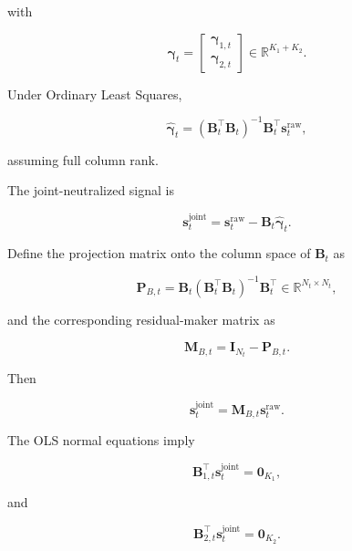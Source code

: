 \documentclass[11pt,a4paper]{article}
\begin{document}
with

\begin{equation}
\boldsymbol{\gamma}_t
=
\begin{bmatrix}
\boldsymbol{\gamma}_{1,t}
\\
\boldsymbol{\gamma}_{2,t}
\end{bmatrix}
\in
\mathbb{R}^{K_1+K_2}.
\end{equation}

Under Ordinary Least Squares,

\begin{equation}
\widehat{\boldsymbol{\gamma}}_t
=
\left(
\mathbf{B}_t^\top
\mathbf{B}_t
\right)^{-1}
\mathbf{B}_t^\top
\mathbf{s}_t^{\mathrm{raw}},
\end{equation}

assuming full column rank.

The joint-neutralized signal is

\begin{equation}
\boxed{
\mathbf{s}_t^{\mathrm{joint}}
=
\mathbf{s}_t^{\mathrm{raw}}
-
\mathbf{B}_t
\widehat{\boldsymbol{\gamma}}_t.
}
\end{equation}

Define the projection matrix onto the column space of $\mathbf{B}_t$ as

\begin{equation}
\mathbf{P}_{B,t}
=
\mathbf{B}_t
\left(
\mathbf{B}_t^\top
\mathbf{B}_t
\right)^{-1}
\mathbf{B}_t^\top
\in
\mathbb{R}^{N_t\times N_t},
\end{equation}

and the corresponding residual-maker matrix as

\begin{equation}
\boxed{
\mathbf{M}_{B,t}
=
\mathbf{I}_{N_t}
-
\mathbf{P}_{B,t}.
}
\end{equation}

Then

\begin{equation}
\boxed{
\mathbf{s}_t^{\mathrm{joint}}
=
\mathbf{M}_{B,t}
\mathbf{s}_t^{\mathrm{raw}}.
}
\end{equation}

The OLS normal equations imply

\begin{equation}
\boxed{
\mathbf{B}_{1,t}^\top
\mathbf{s}_t^{\mathrm{joint}}
=
\mathbf{0}_{K_1},
}
\end{equation}

and

\begin{equation}
\boxed{
\mathbf{B}_{2,t}^\top
\mathbf{s}_t^{\mathrm{joint}}
=
\mathbf{0}_{K_2}.
}
\end{equation}
\end{document}
